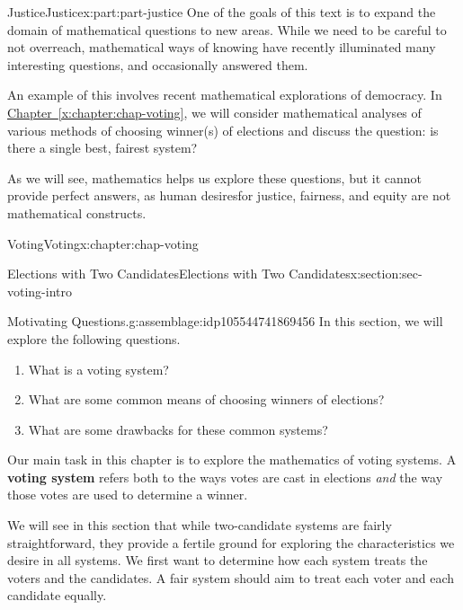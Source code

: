 \documentclass[oneside,10pt,]{book}
\newcommand{\xreffont}{\relax}
\newcommand{\terminology}[1]{\textbf{#1}}
\numberwithin{equation}{section}
\begin{document}
\begin{partptx}{Justice}{}{Justice}{}{}{x:part:part-justice}
 One of the goals of this text is to expand the domain of mathematical questions to new areas. While we need to be careful to not overreach, mathematical ways of knowing have recently illuminated many interesting questions, and occasionally answered them.%
\par
An example of this involves recent mathematical explorations of democracy. In \hyperref[x:chapter:chap-voting]{Chapter~{\xreffont\ref{x:chapter:chap-voting}}}, we will consider mathematical analyses of various methods of choosing winner(s) of elections and discuss the question: is there a single best, fairest system? %
\par
As we will see, mathematics helps us explore these questions, but it cannot provide perfect answers, as human desires\textemdash{}for justice, fairness, and equity\textemdash{} are not mathematical constructs.%
%
\typeout{************************************************}
\typeout{************************************************}
%
\begin{chapterptx}{Voting}{}{Voting}{}{}{x:chapter:chap-voting}
%
%
\typeout{************************************************}
\typeout{************************************************}
%
\begin{sectionptx}{Elections with Two Candidates}{}{Elections with Two Candidates}{}{}{x:section:sec-voting-intro}
\begin{assemblage}{Motivating Questions.}{g:assemblage:idp105544741869456}%
In this section, we will explore the following questions. %
\begin{enumerate}
\item{}What is a voting system?%
\item{}What are some common means of choosing winners of elections?%
\item{}What are some drawbacks for these common systems?%
\end{enumerate}
%
\end{assemblage}
\begin{introduction}{}%
Our main task in this chapter is to explore the mathematics of voting systems. A \terminology{voting system} refers both to the ways votes are cast in elections \emph{and} the way those votes are used to determine a winner.%
\par
We will see in this section that while two-candidate systems are fairly straightforward, they provide a fertile ground for exploring the characteristics we desire in all systems. We first want to determine how each system treats the voters and the candidates. A fair system should aim to treat each voter and each candidate equally.%

\end{introduction}
\end{sectionptx}
\end{chapterptx}
\end{partptx}
\end{document}
